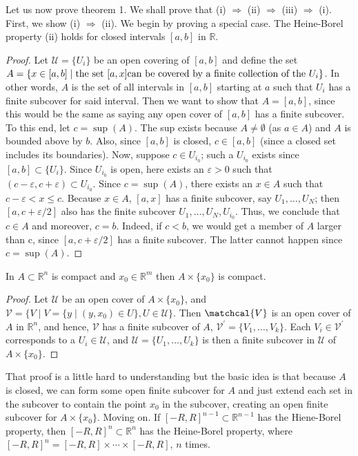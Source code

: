 \documentclass[11pt]{article}
\theoremstyle{definition}
\newcommand{\R}{\mathbb{R}}                      %
\begin{document}
Let us now prove theorem 1. We shall prove that (i) $\Rightarrow$ (ii) $\Rightarrow$ (iii) $\Rightarrow$ (i). First, we show (i) $\Rightarrow$ (ii). We begin by proving a special case.
    \lem The Heine-Borel property (ii) holds for closed intervals $[a,b]$ in $\R$.
\begin{proof}
    Let $\mathcal{U}=\{U_i\}$ be an open covering of $[a,b]$ and define the set $A=\{x\in[a,b]\;|\; \mbox{the set $[a,x]$}\\
    \mbox{can be covered by a finite collection of the } U_i\}$. In other words, $A$ is the set of all intervals in $[a,b]$ starting at $a$ such that $U_i$ has a finite subcover for said interval. Then we want to show that $A=[a,b]$, since this would be the same as saying any open cover of $[a,b]$ has a finite subcover. To this end, let $c=\sup (A)$. The sup exists because $A\neq\emptyset$ (as $a\in A$) and $A$ is bounded above by $b$. Also, since $[a,b]$ is closed, $c\in [a,b]$ (since a closed set includes its boundaries). Now, suppose $c\in U_{i_0}$; such a $U_{i_0}$ exists since $[a,b]\subset\{U_i\}$. Since $U_{i_0}$ is open, here exists an $\varepsilon > 0$ such that $(c-\varepsilon,c+\varepsilon)\subset U_{i_0}$. Since $c=\sup(A)$, there exists an $x\in A$ such that $c-\varepsilon < x\leq c$. Because $x\in A$, $[a,x]$ has a finite subcover, say $U_1,\dots,U_N$; then $[a,c+\varepsilon/2]$ also has the finite subcover $U_1,\dots,U_N,U_{i_0}$. Thus, we conclude that $c\in A$ and moreover, $c=b$. Indeed, if $c<b$, we would get a member of $A$ larger than c, since $[a,c+\varepsilon/2]$ has a finite subcover. The latter cannot happen since $c=\sup(A)$.
\end{proof}
    \lem In $A\subset \R^n$ is compact and $x_0\in \R^m$ then $A\times \{x_0\}$ is compact.
\begin{proof}
    Let $\mathcal{U}$ be an open cover of $A\times\{x_0\}$, and $\mathcal{V}=\{V\;|\; V= \{y\;|\; (y,x_0)\in U\}, U\in\mathcal{U}\}$. Then $\matchcal{V}$ is an open cover of $A$ in $\R^n$, and hence, $\mathcal{V}$ has a finite subcover of $A$, $\mathcal{V}^'=\{V_1,\dots,V_k\}$. Each $V_i\in\mathcal{V}^'$ corresponds to a $U_i\in \mathcal{U}$, and $\mathcal{U}=\{U_1,\dots,U_k\}$ is then a finite subcover in $\mathcal{U}$ of $A\times\{x_0\}$.
\end{proof}
That proof is a little hard to understanding but the basic idea is that because $A$ is closed, we can form some open finite subcover for $A$ and just extend each set in the subcover to contain the point $x_0$ in the subcover, creating an open finite subcover for $A\times\{x_0\}$. Moving on.
\lem If $[-R,R]^{n-1}\subset \R^{n-1}$ has the Hiene-Borel property, then $[-R,R]^n\subset \R^n$ has the Heine-Borel property, where $[-R,R]^n=[-R,R]\times\cdots\times[-R,R]$, $n$ times.
\end{document}
